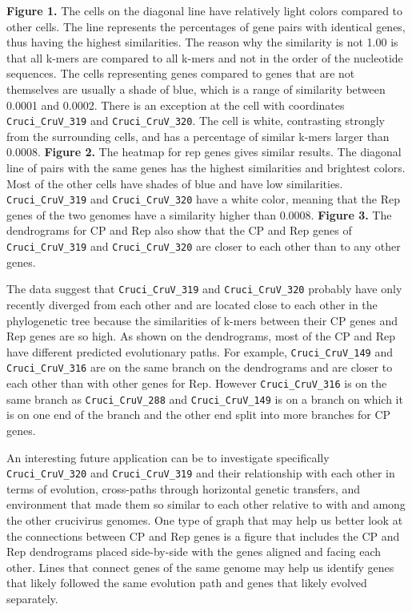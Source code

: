 \documentclass[eng]{ajceam-class}
\begin{document}
\textbf{Figure 1.} The cells on the diagonal line have relatively light colors compared to other cells. The line represents the percentages of gene pairs with identical genes, thus having the highest similarities. The reason why the similarity is not 1.00 is that all k-mers are compared to all k-mers and not in the order of the nucleotide sequences. The cells representing genes compared to genes that are not themselves are usually a shade of blue, which is a range of similarity between 0.0001 and 0.0002. There is an exception at the cell with coordinates \texttt{Cruci\_CruV\_319} and \texttt{Cruci\_CruV\_320}. The cell is white, contrasting strongly from the surrounding cells, and has a percentage of similar k-mers larger than 0.0008. \textbf{Figure 2.} The heatmap for rep genes gives similar results. The diagonal line of pairs with the same genes has the highest similarities and brightest colors. Most of the other cells have shades of blue and have low similarities. \texttt{Cruci\_CruV\_319} and \texttt{Cruci\_CruV\_320} have a white color, meaning that the Rep genes of the two genomes have a similarity higher than 0.0008. \textbf{Figure 3.} The dendrograms for CP and Rep also show that the CP and Rep genes of \texttt{Cruci\_CruV\_319} and \texttt{Cruci\_CruV\_320} are closer to each other than to any other genes. 

The data suggest that \texttt{Cruci\_CruV\_319} and \texttt{Cruci\_CruV\_320} probably have only recently diverged from each other and are located close to each other in the phylogenetic tree because the similarities of k-mers between their CP genes and Rep genes are so high. As shown on the dendrograms, most of the CP and Rep have different predicted evolutionary paths. For example, \texttt{Cruci\_CruV\_149} and \texttt{Cruci\_CruV\_316} are on the same branch on the dendrograms and are closer to each other than with other genes for Rep. However \texttt{Cruci\_CruV\_316} is on the same branch as \texttt{Cruci\_CruV\_288} and \texttt{Cruci\_CruV\_149} is on a branch on which it is on one end of the branch and the other end split into more branches for CP genes. 

An interesting future application can be to investigate specifically \texttt{Cruci\_CruV\_320} and \texttt{Cruci\_CruV\_319} and their relationship with each other in terms of evolution, cross-paths through horizontal genetic transfers, and environment that made them so similar to each other relative to with and among the other crucivirus genomes. One type of graph that may help us better look at the connections between CP and Rep genes is a figure that includes the CP and Rep dendrograms placed side-by-side with the genes aligned and facing each other. Lines that connect genes of the same genome may help us identify genes that likely followed the same evolution path and genes that likely evolved separately.
\end{document}
